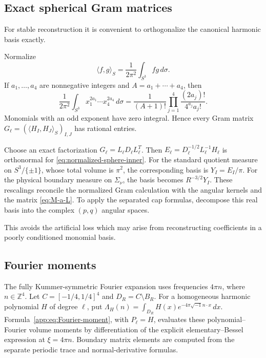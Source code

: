 \documentclass[11pt,a4paper,twoside]{article}
\numberwithin{equation}{section}
\theoremstyle{definition}
\theoremstyle{remark}
\newcommand{\ii}{\sqrt{-1}}
\begin{document}
\subsection{Exact spherical Gram matrices}
\label{subsec:exact-Gram}

For stable reconstruction it is convenient to orthogonalize the
canonical harmonic basis exactly.

Normalize
\begin{equation}\label{eq:normalized-sphere-inner}
\langle f,g\rangle_S
=
\frac1{2\pi^2}
\int_{S^3}
fg\,d\sigma.
\end{equation}
If \(a_1,\ldots,a_4\) are nonnegative integers and
\(A=a_1+\cdots+a_4\), then
\[
\frac1{2\pi^2}
\int_{S^3}
x_1^{2a_1}\cdots x_4^{2a_4}\,d\sigma
=
\frac1{(A+1)!}
\prod_{j=1}^4
\frac{
(2a_j)!
}{
4^{a_j}a_j!
}.
\]
Monomials with an odd exponent have zero integral. Hence every Gram
matrix \(G_\ell=\left(\langle H_I,H_J\rangle_S\right)_{I,J}\)
has rational entries.

Choose an exact factorization \(G_\ell=L_\ell D_\ell L_\ell^T\).
Then \(E_\ell=D_\ell^{-1/2}L_\ell^{-1}H_\ell\) is orthonormal
for \eqref{eq:normalized-sphere-inner}.
For the standard quotient measure on \(S^3/\{\pm1\}\), whose
total volume is \(\pi^2\), the corresponding basis is
\(Y_I=E_I/\pi\). For the physical boundary measure on
\(\Sigma_\nu\), the basis becomes \(R^{-3/2}Y_I\).
These rescalings reconcile the normalized Gram calculation with
the angular kernels and the matrix \eqref{eq:M-a-L}.
To apply the separated cap formulas, decompose this real basis into the complex \((p,q)\) angular spaces.

This avoids the artificial loss which may arise from reconstructing
coefficients in a poorly conditioned monomial basis.

\subsection{Fourier moments}
\label{subsec:computational-Fourier-moments}

The fully Kummer-symmetric Fourier expansion uses frequencies
\(4\pi n\), where \(n\in\mathbb Z^4\). Let \(C=[-1/4,1/4]^4\)
and \(D_R=C\setminus B_R\). For a homogeneous harmonic polynomial
\(H\) of degree \(\ell\), put
\(\Lambda_H(n)=\int_{D_R}H(x)e^{-4\pi\ii n\cdot x}\,dx\).
Formula~\eqref{app:eq:Fourier-moment}, with \(P_\ell=H\), evaluates
these polynomial--Fourier volume moments by differentiation of the
explicit elementary--Bessel expression at \(\xi=4\pi n\).
Boundary matrix elements are computed from the separate periodic
trace and normal-derivative formulas.
\end{document}
